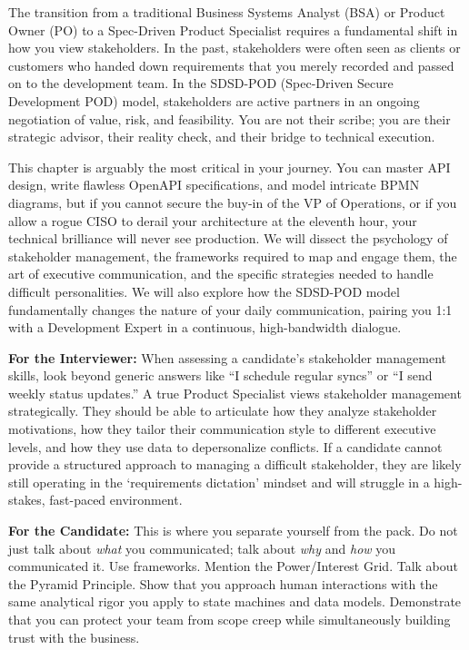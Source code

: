 \documentclass[
  11pt,
  openany,
  oneside]{book}
\renewenvironment{quote}{\begin{customquote}}{\end{customquote}}
\begin{document}
The transition from a traditional Business Systems Analyst (BSA) or
Product Owner (PO) to a Spec-Driven Product Specialist requires a
fundamental shift in how you view stakeholders. In the past,
stakeholders were often seen as clients or customers who handed down
requirements that you merely recorded and passed on to the development
team. In the SDSD-POD (Spec-Driven Secure Development POD) model,
stakeholders are active partners in an ongoing negotiation of value,
risk, and feasibility. You are not their scribe; you are their strategic
advisor, their reality check, and their bridge to technical execution.

This chapter is arguably the most critical in your journey. You can
master API design, write flawless OpenAPI specifications, and model
intricate BPMN diagrams, but if you cannot secure the buy-in of the VP
of Operations, or if you allow a rogue CISO to derail your architecture
at the eleventh hour, your technical brilliance will never see
production. We will dissect the psychology of stakeholder management,
the frameworks required to map and engage them, the art of executive
communication, and the specific strategies needed to handle difficult
personalities. We will also explore how the SDSD-POD model fundamentally
changes the nature of your daily communication, pairing you 1:1 with a
Development Expert in a continuous, high-bandwidth dialogue.

\begin{quote}
\textbf{For the Interviewer:} When assessing a candidate's stakeholder
management skills, look beyond generic answers like ``I schedule regular
syncs'' or ``I send weekly status updates.'' A true Product Specialist
views stakeholder management strategically. They should be able to
articulate how they analyze stakeholder motivations, how they tailor
their communication style to different executive levels, and how they
use data to depersonalize conflicts. If a candidate cannot provide a
structured approach to managing a difficult stakeholder, they are likely
still operating in the `requirements dictation' mindset and will
struggle in a high-stakes, fast-paced environment.
\end{quote}

\begin{quote}
\textbf{For the Candidate:} This is where you separate yourself from the
pack. Do not just talk about \emph{what} you communicated; talk about
\emph{why} and \emph{how} you communicated it. Use frameworks. Mention
the Power/Interest Grid. Talk about the Pyramid Principle. Show that you
approach human interactions with the same analytical rigor you apply to
state machines and data models. Demonstrate that you can protect your
team from scope creep while simultaneously building trust with the
business.
\end{quote}
\end{document}
